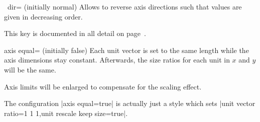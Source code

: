 {\def\pgfmanualpdflabel#1#2{}
\begin{pgfplotsxykey}{\x\ dir= (initially normal)}
	Allows to reverse axis directions such that values are given in decreasing order.

	This key is documented in all detail on page~\pageref{key:pgfplots:xydir}.
\end{pgfplotsxykey}
}

\begin{pgfplotskey}{axis equal= (initially false)}
	Each unit vector is set to the same length while the axis dimensions stay constant. Afterwards, the size ratios for each unit in $x$ and $y$ will be the same.
	
	Axis limits will be enlarged to compensate for the scaling effect.
\begin{codeexample}[]
\hspace{1cm}
\end{codeexample}
	
\begin{codeexample}[]
\hspace{1cm}
\end{codeexample}

\begin{codeexample}[]
\end{codeexample}

	The configuration |axis equal=true| is actually just a style which sets |unit vector ratio=1 1 1,unit rescale keep size=true|.
\end{pgfplotskey}


